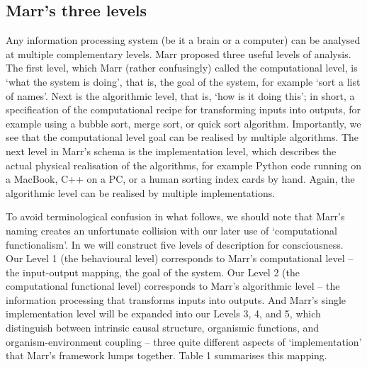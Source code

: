 \documentclass[11pt, a4paper, onecolumn, gdm]{google}
\begin{document}
\subsection{Marr's three levels}\label{marrs-three-levels}

Any information processing system (be it a brain or a computer) can be analysed at multiple complementary levels.
Marr proposed three useful levels of analysis.
The first level, which Marr (rather confusingly) called the computational level, is `what the system is doing', that is, the goal of the system, for example `sort a list of names'.
Next is the algorithmic level, that is, `how is it doing this'; in short, a specification of the computational recipe for transforming inputs into outputs, for example using a bubble sort, merge sort, or quick sort algorithm.
Importantly, we see that the computational level goal can be realised by multiple algorithms.
The next level in Marr's schema is the implementation level, which describes the actual physical realisation of the algorithms, for example Python code running on a MacBook, C++ on a PC, or a human sorting index cards by hand.
Again, the algorithmic level can be realised by multiple implementations.

To avoid terminological confusion in what follows, we should note that Marr's naming creates an unfortunate collision with our later use of `computational functionalism'.
In  we will construct five levels of description for consciousness.
Our Level 1 (the behavioural level) corresponds to Marr's computational level -- the input-output mapping, the goal of the system.
Our Level 2 (the computational functional level) corresponds to Marr's algorithmic level -- the information processing that transforms inputs into outputs.
And Marr's single implementation level will be expanded into our Levels 3, 4, and 5, which distinguish between intrinsic causal structure, organismic functions, and organism-environment coupling -- three quite different aspects of `implementation' that Marr's framework lumps together.
Table 1 summarises this mapping.
\end{document}
